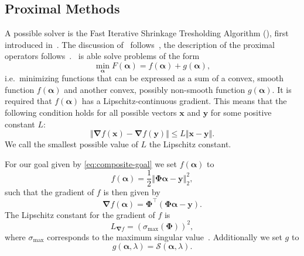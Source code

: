 \subsection{Proximal Methods}
A possible solver is the Fast Iterative Shrinkage Tresholding Algorithm (\fista), first introduced in~\cite{fista}.
The discussion of \fista\ follows~\cite{fista}, the description of
the proximal operators follows~\cite{proxsurvey}.
\fista\ is able solve problems of the form
\begin{equation}\label{eq:composite-goal}
\min_{\bm{\alpha}} F(\bm{\alpha}) = f(\bm{\alpha}) + g(\bm{\alpha}),
\end{equation}
i.e.~minimizing functions that can be expressed as a sum of a convex, smooth function \(f(\bm{\alpha})\) and another convex, possibly non-smooth function \(g(\bm{\alpha})\).
It is required that \(f(\bm{\alpha})\) has a Lipschitz-continuous gradient. 
This means that the following condition holds for all possible vectors \(\bm{x}\) and \(\bm{y}\) for some positive constant \(L\):
\begin{equation}   \label{eq:lipschitz}
 \Vert \bm{\nabla} f(\bm{x}) - \bm{\nabla} f(\bm{y}) \Vert \leq L \Vert \bm{x} - \bm{y} \Vert.
\end{equation}
We call the smallest possible value of \(L\) the Lipschitz constant.

For our goal given by \autoref{eq:composite-goal} we set \(f(\bm{\alpha})\) to
\begin{equation*}
 f(\bm{\alpha}) = \frac{1}{2} \left\Vert  \bm{\Phi} \bm{\alpha} - \bm{y}   \right\Vert_2^2,
\end{equation*}
such that the gradient of \(f\) is then given by
\begin{equation*}
  \bm{\nabla} f(\bm{\alpha}) = \bm{\Phi}^\intercal \left(\bm{\Phi} \bm{\alpha} - \bm{y} \right).
\end{equation*}
The Lipschitz constant for the gradient of \(f\) is
\begin{equation}
  \label{eq:lipf}
  L_{\bm{\nabla} f} = {\left(\sigma_{\max} \left(\bm{\Phi}\right)\right)}^2,
\end{equation}
where \(\sigma_{\max} \) corresponds to the maximum singular value~\autocite{fista}.
Additionally we set \(g\) to
\begin{equation*}
  g(\bm{\alpha}, \lambda) = \mathcal{S} \left( \bm{\alpha}, \lambda \right).
\end{equation*}

